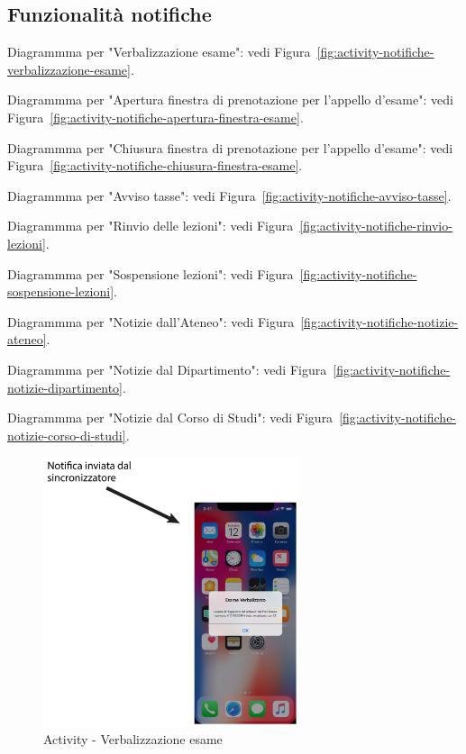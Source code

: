 \subsection{Funzionalità notifiche}

Diagrammma per "Verbalizzazione esame": vedi Figura~\vref{fig:activity-notifiche-verbalizzazione-esame}.

Diagrammma per "Apertura finestra di prenotazione per l'appello d'esame": vedi Figura~\vref{fig:activity-notifiche-apertura-finestra-esame}.

Diagrammma per "Chiusura finestra di prenotazione per l'appello d'esame": vedi Figura~\vref{fig:activity-notifiche-chiusura-finestra-esame}.

Diagrammma per "Avviso tasse": vedi Figura~\vref{fig:activity-notifiche-avviso-tasse}.

Diagrammma per "Rinvio delle lezioni": vedi Figura~\vref{fig:activity-notifiche-rinvio-lezioni}.

Diagrammma per "Sospensione lezioni": vedi Figura~\vref{fig:activity-notifiche-sospensione-lezioni}.

Diagrammma per "Notizie dall'Ateneo": vedi Figura~\vref{fig:activity-notifiche-notizie-ateneo}.

Diagrammma per "Notizie dal Dipartimento": vedi Figura~\vref{fig:activity-notifiche-notizie-dipartimento}.

Diagrammma per "Notizie dal Corso di Studi": vedi Figura~\vref{fig:activity-notifiche-notizie-corso-di-studi}.

\begin{figure}[h]
	\centering
	\includegraphics[width=0.67\textwidth]{imgs/gruppo2/activity-notifiche-verbalizzazione-esame}
	\caption{Activity - Verbalizzazione esame}
	\label{fig:activity-notifiche-verbalizzazione-esame}
\end{figure}

